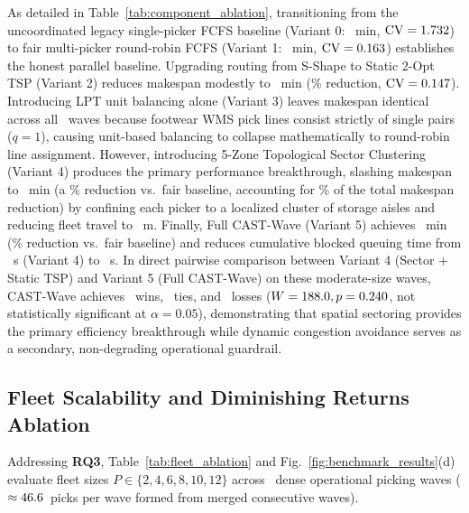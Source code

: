 \documentclass[conference]{IEEEtran}
\begin{document}
As detailed in Table~\ref{tab:component_ablation}, transitioning from the uncoordinated legacy single-picker FCFS baseline (Variant 0: \LegacyMakespanMin~min, $\text{CV} = 1.732$) to fair multi-picker round-robin FCFS (Variant 1: \MakespanSShapeMin~min, $\text{CV} = 0.163$) establishes the honest parallel baseline. Upgrading routing from S-Shape to Static 2-Opt TSP (Variant 2) reduces makespan modestly to \MakespanTSPMin~min (\StaticTSPRedVsSShapePct\% reduction, $\text{CV} = 0.147$). Introducing LPT unit balancing alone (Variant 3) leaves makespan identical across all \LPTIdenticalWaves~waves because footwear WMS pick lines consist strictly of single pairs ($q = 1$), causing unit-based balancing to collapse mathematically to round-robin line assignment. However, introducing 5-Zone Topological Sector Clustering (Variant 4) produces the primary performance breakthrough, slashing makespan to \MakespanSectorMin~min (a \SectorReductionVsFairPct\% reduction vs.\ fair baseline, accounting for \SectorShareOfGainPct\% of the total makespan reduction) by confining each picker to a localized cluster of storage aisles and reducing fleet travel to \DistSectorM~m. Finally, Full CAST-Wave (Variant 5) achieves \MakespanCASTMin~min (\MakespanRedSShapePct\% reduction vs.\ fair baseline) and reduces cumulative blocked queuing time from \BlockedSectorSec~s (Variant 4) to \BlockedCASTSec~s. In direct pairwise comparison between Variant 4 (Sector + Static TSP) and Variant 5 (Full CAST-Wave) on these moderate-size waves, CAST-Wave achieves \WinsVsSector~wins, \TiesVsSector~ties, and \LossesVsSector~losses ($W = 188.0, p = 0.240$, not statistically significant at $\alpha = 0.05$), demonstrating that spatial sectoring provides the primary efficiency breakthrough while dynamic congestion avoidance serves as a secondary, non-degrading operational guardrail.

\subsection{Fleet Scalability and Diminishing Returns Ablation}
\label{sec:fleet_ablation}
Addressing \textbf{RQ3}, Table~\ref{tab:fleet_ablation} and Fig.~\ref{fig:benchmark_results}(d) evaluate fleet sizes $P \in \{2, 4, 6, 8, 10, 12\}$ across \DenseWavesCount~dense operational picking waves ($\approx 46.6$~picks per wave formed from merged consecutive waves).


\end{document}
